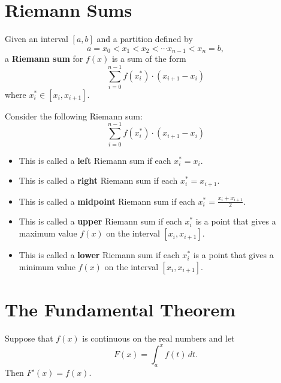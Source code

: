 \documentclass{ximera}
\renewcommand{\d}{\,d}
\begin{document}
\section*{Riemann Sums}





\begin{definition}
Given an interval $[a,b]$ and a partition defined by
\[
a = x_0 < x_1 <x_2 < \cdots x_{n-1}< x_n = b,
\]
a \textbf{Riemann sum} for $f(x)$ is a sum of the form
\[
\sum_{i=0}^{n-1} f(x_i^*) \cdot (x_{i+1}-x_i)
\]
where $x_i^*\in [x_i,x_{i+1}]$.
\end{definition}




\begin{definition}
Consider the following Riemann sum:
\[
\sum_{i=0}^{n-1} f(x_i^*) \cdot (x_{i+1}-x_i)
\]
\begin{itemize}
\item This is called a \textbf{left} Riemann sum if each $x_i^* =
x_i$.
\item This is called a \textbf{right} Riemann sum if each $x_i^* =
x_{i+1}$.
\item This is called a \textbf{midpoint} Riemann sum if each $x_i^*
= \frac{x_i+x_{i+1}}{2}$.
\item This is called a \textbf{upper} Riemann sum if each $x_i^*$ is
a point that gives a maximum value $f(x)$ on the interval
$[x_i,x_{i+1}]$.
\item This is called a \textbf{lower} Riemann sum if each $x_i^*$ is a
point that gives a minimum value $f(x)$ on the interval
$[x_i,x_{i+1}]$.
\end{itemize}
\end{definition}







\section*{The Fundamental Theorem}







\begin{theorem}
\label{thm:fundamental_theorem_I}\hfil
\noindent Suppose that $f(x)$ is continuous on the real numbers and let
\[
F(x)=\int_a^x f(t)\d t.
\]
Then $F'(x)=f(x)$.
\end{theorem}
\end{document}
